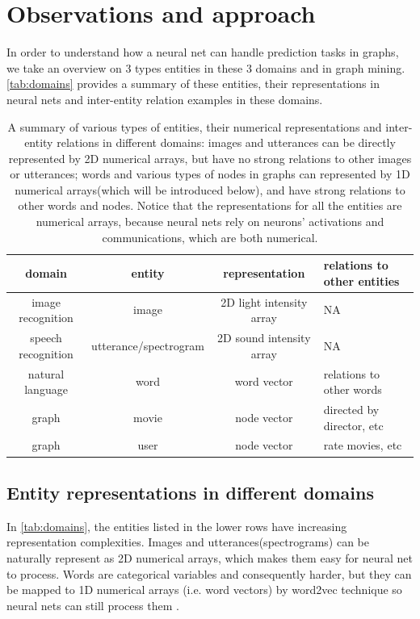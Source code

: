 \documentclass{article}
\begin{document}
\section{Observations and approach}
In order to understand how a neural net can handle prediction tasks in graphs, 
we take an overview on 3 types entities in these 3 domains and in graph mining. 
\autoref{tab:domains} provides a summary of these entities, their 
representations in neural nets and inter-entity relation examples in these 
domains.
\begin{table}[H]
	\centering
	\begin{tabularx}{\textwidth}{ |c|c|c|X| }
		\hline domain & entity & representation & relations to other entities 
		\\ 
		\hline image recognition & image & 2D light intensity array & NA \\ 
		\hline speech recognition & utterance/spectrogram & 2D sound intensity 
		array & NA \\ 
		\hline natural language & word & word vector & relations to other words 
		\\ 
		\hline graph & movie & node vector & directed by director, etc \\ 
		\hline graph & user & node vector & rate movies, etc \\
		\hline
	\end{tabularx}
	\caption{A summary of various types of entities, their numerical 
	representations and inter-entity relations in different domains: images and 
	utterances can be directly represented by 2D numerical arrays, but have no 
	strong relations to other images or utterances; words and various types of 
	nodes in graphs can represented by 1D numerical arrays(which will be 
	introduced below), and have strong relations to other words and nodes. 
	Notice that the representations for all the entities are numerical arrays, 
	because neural nets rely on neurons' activations and communications, which 
	are both numerical.}
	\label{tab:domains}
\end{table}

\subsection{Entity representations in different domains}
In \autoref{tab:domains}, the entities listed in the lower rows have increasing 
representation complexities. Images and utterances(spectrograms) can be 
naturally represent as 2D numerical arrays, which makes them easy for neural 
net to process. Words are categorical variables and consequently harder, but 
they can be mapped to 1D numerical arrays (i.e. word vectors) by word2vec 
technique so neural nets can still process them \cite{mikolov2013efficient}.
\end{document}
